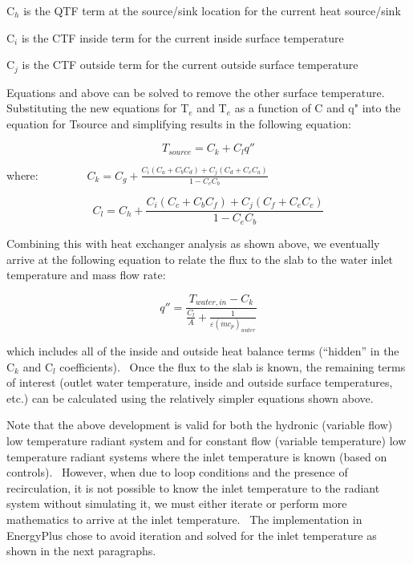 C\(_{h}\) is the QTF term at the source/sink location for the current heat source/sink

C\(_{i}\) is the CTF inside term for the current inside surface temperature

C\(_{j}\) is the CTF outside term for the current outside surface temperature

Equations and above can be solved to remove the other surface temperature.~ Substituting the new equations for T\(_{e}\) and T\(_{e}\) as a function of C and q" into the equation for Tsource and simplifying results in the following equation:

\begin{equation}
{T_{source}} = {C_k} + {C_l}q''
\end{equation}

where:~~~~~~~~ \({C_k} = {C_g} + \frac{{{C_i}\left( {{C_a} + {C_b}{C_d}} \right) + {C_j}\left( {{C_d} + {C_e}{C_a}} \right)}}{{1 - {C_e}{C_b}}}\)

\begin{equation}
{C_l} = {C_h} + \frac{{{C_i}\left( {{C_c} + {C_b}{C_f}} \right) + {C_j}\left( {{C_f} + {C_e}{C_c}} \right)}}{{1 - {C_e}{C_b}}}
\end{equation}

Combining this with heat exchanger analysis as shown above, we eventually arrive at the following equation to relate the flux to the slab to the water inlet temperature and mass flow rate:

\begin{equation}
q'' = \frac{{{T_{water,in}} - {C_k}}}{{\frac{{{C_l}}}{A} + \frac{1}{{\varepsilon {{\left( {\dot m{c_p}} \right)}_{water}}}}}}
\end{equation}

which includes all of the inside and outside heat balance terms (``hidden'' in the C\(_{k}\) and C\(_{l}\) coefficients).~ Once the flux to the slab is known, the remaining terms of interest (outlet water temperature, inside and outside surface temperatures, etc.) can be calculated using the relatively simpler equations shown above.

Note that the above development is valid for both the hydronic (variable flow) low temperature radiant system and for constant flow (variable temperature) low temperature radiant systems where the inlet temperature is known (based on controls).~ However, when due to loop conditions and the presence of recirculation, it is not possible to know the inlet temperature to the radiant system without simulating it, we must either iterate or perform more mathematics to arrive at the inlet temperature.~ The implementation in EnergyPlus chose to avoid iteration and solved for the inlet temperature as shown in the next paragraphs.

